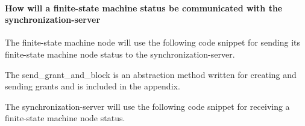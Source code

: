 \hypertarget{how-will-a-finite-state-machine-status-be-communicated-with-the-synchronization-server}{%
\paragraph{How will a finite-state machine status be communicated with
the
synchronization-server}\label{how-will-a-finite-state-machine-status-be-communicated-with-the-synchronization-server}}

The finite-state machine node will use the following code snippet for
sending its finite-state machine node status to the
synchronization-server.

\begin{Shaded}
\begin{Highlighting}[]
\NormalTok{\{}


\NormalTok{\}}
\end{Highlighting}
\end{Shaded}

The send\_grant\_and\_block is an abstraction method written for
creating and sending grants and is included in the appendix.

The synchronization-server will use the following code snippet for
receiving a finite-state machine node status.

\begin{Shaded}
\begin{Highlighting}[]
\NormalTok{\{}




\NormalTok{    \{}
\NormalTok{    \}}
\NormalTok{    \{}
\NormalTok{    \}}
\NormalTok{\}}
\end{Highlighting}
\end{Shaded}

